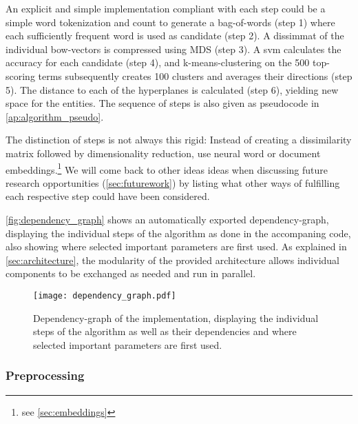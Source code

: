 An explicit and simple implementation compliant with each step could be a simple word tokenization and count to generate a bag-of-words (step 1) where each sufficiently frequent word is used as candidate (step 2). A \gls{dissimmat} of the individual \gls{bow}-vectors is compressed using MDS (step 3). A \gls{svm} calculates the accuracy for each candidate (step 4), and k-means-clustering on the 500 top-scoring terms subsequently creates 100 clusters and averages their directions (step 5). The distance to each of the hyperplanes is calculated (step 6), yielding new space for the entities. The sequence of steps is also given as pseudocode in \autoref{ap:algorithm_pseudo}. 
 
 The distinction of steps is not always this rigid: Instead of creating a dissimilarity matrix followed by dimensionality reduction, \cite{Ager2018,Alshaikh2020} use neural word or document embeddings.\footnote{see \autoref{sec:embeddings}} %
 We will come back to other ideas ideas when discussing future research opportunities (\autoref{sec:futurework}) by listing what other ways of fulfilling each respective step could have been considered.

\autoref{fig:dependency_graph} shows an automatically exported dependency-graph, displaying the individual steps of the algorithm as done in the accompaning code, also showing where selected important parameters are first used. As explained in \autoref{sec:architecture}, the modularity of the provided architecture allows individual components to be exchanged as needed and run in parallel.


\begin{figure}[h]
	\begin{center}
	  \texttt{[image: dependency\_graph.pdf]}
	  \caption[Dependency-graph of the implementation]{Dependency-graph of the implementation, displaying the individual steps of the algorithm as well as their dependencies and where selected important parameters are first used. }
	  \label{fig:dependency_graph}
	\end{center}
\end{figure}


\subsubsection{Preprocessing}


